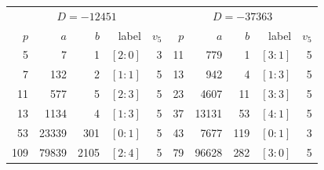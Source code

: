 \begin{center}\small
\begin{tabular}{rrrrr@{\qquad}rrrrr}
\toprule
\multicolumn{5}{c}{$D=-12451$} & \multicolumn{5}{c}{$D=-37363$}\\
$p$ & $a$ & $b$ & label & $v_5$ & $p$ & $a$ & $b$ & label & $v_5$\\
\midrule
5 & 7 & 1 & $[2\!:\!0]$ & 3 & 11 & 779 & 1 & $[3\!:\!1]$ & 5\\
7 & 132 & 2 & $[1\!:\!1]$ & 5 & 13 & 942 & 4 & $[1\!:\!3]$ & 5\\
11 & 577 & 5 & $[2\!:\!3]$ & 5 & 23 & 4607 & 11 & $[3\!:\!3]$ & 5\\
13 & 1134 & 4 & $[1\!:\!3]$ & 5 & 37 & 13131 & 53 & $[4\!:\!1]$ & 5\\
53 & 23339 & 301 & $[0\!:\!1]$ & 5 & 43 & 7677 & 119 & $[0\!:\!1]$ & 3\\
109 & 79839 & 2105 & $[2\!:\!4]$ & 5 & 79 & 96628 & 282 & $[3\!:\!0]$ & 5\\
\bottomrule\end{tabular}
\end{center}
